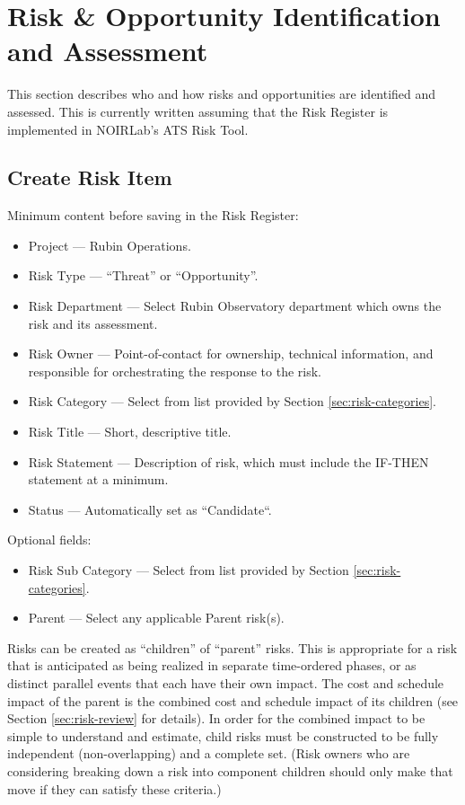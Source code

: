\section{Risk \& Opportunity Identification and Assessment}
\label{sec:id-assess}

This section describes who and how risks and opportunities are identified and assessed.
This is currently written assuming that the Risk Register is implemented in NOIRLab's ATS Risk Tool.

\subsection{Create Risk Item}

Minimum content before saving in the Risk Register:
\begin{itemize}
	\item Project --- Rubin Operations.
	\item Risk Type --- ``Threat'' or ``Opportunity''.
	\item Risk Department --- Select Rubin Observatory department which owns the risk and its assessment.
	\item Risk Owner --- Point-of-contact for ownership, technical information, and responsible for orchestrating the response to the risk.
	\item Risk Category --- Select from list provided by Section \ref{sec:risk-categories}.
	\item Risk Title --- Short, descriptive title.
	\item Risk Statement --- Description of risk, which must include the IF-THEN statement at a minimum.
	\item Status --- Automatically set as ``Candidate``.
\end{itemize}

Optional fields:
\begin{itemize}
	\item Risk Sub Category --- Select from list provided by Section \ref{sec:risk-categories}.
	\item Parent --- Select any applicable Parent risk(s).
\end{itemize}

Risks can be created as ``children'' of ``parent'' risks.
This is appropriate for a risk that is anticipated as being realized in separate time-ordered phases, or as distinct parallel events that each have their own impact.
The cost and schedule impact of the parent is the combined cost and schedule impact of its children (see Section \ref{sec:risk-review} for details).
In order for the combined impact to be simple to understand and estimate, child risks must be constructed to be fully independent (non-overlapping) and a complete set.
(Risk owners who are considering breaking down a risk into component children should only make that move if they can satisfy these criteria.)

